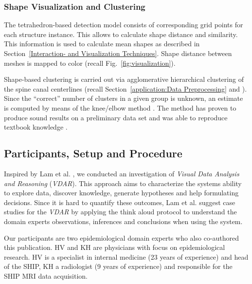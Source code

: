\documentclass[journal]{style/vgtc} 			          %
\newcommand{\com}[1]{\textcolor{orange}{\uline{#1}}}
\begin{document}
\subsubsection{Shape Visualization and Clustering}
%
The tetrahedron-based detection model consists of corresponding grid points for each structure instance.
%
This allows to calculate shape distance and similarity.
%
This information is used to calculate mean shapes as described in Section~\ref{Interaction- and Visualization Techniques}.
%
Shape distance between meshes is mapped to color (recall Fig.~\ref{fig:visualization}).
%
%

Shape-based clustering is carried out via agglomerative hierarchical clustering of the spine canal centerlines (recall Section~\ref{application:Data Preprocessing} and \cite{Klemm2013VMV}).
%
Since the ``correct'' number of clusters in a given group is unknown, an estimate is computed by means of the knee/elbow method \cite{Salvador2004}.
%
The method has proven to produce sound results on a preliminary data set and was able to reproduce textbook knowledge \cite{Klemm2013VMV}.
\subsection{Participants, Setup and Procedure}
%
%
Inspired by Lam et al. \cite{Lam2012}, we conducted an investigation of \emph{Visual Data Analysis and Reasoning} (\emph{VDAR}).
%
This approach aims to characterize the systems ability to explore data, discover knowledge, generate hypotheses and help formulating decisions.
%
Since it is hard to quantify these outcomes, Lam et al. suggest case studies for the \emph{VDAR} by applying the think aloud protocol to understand the domain experts observations, inferences and conclusions when using the system.

Our participants are two epidemiological domain experts who also co-authored this publication.
%
HV and KH are physicians with focus on epidemiological research.
%
HV is a specialist in internal medicine (23 years of experience) and head of the SHIP, KH a radiologist (9 years of experience) and responsible for the SHIP MRI data acquisition. %
%
%
\end{document}
